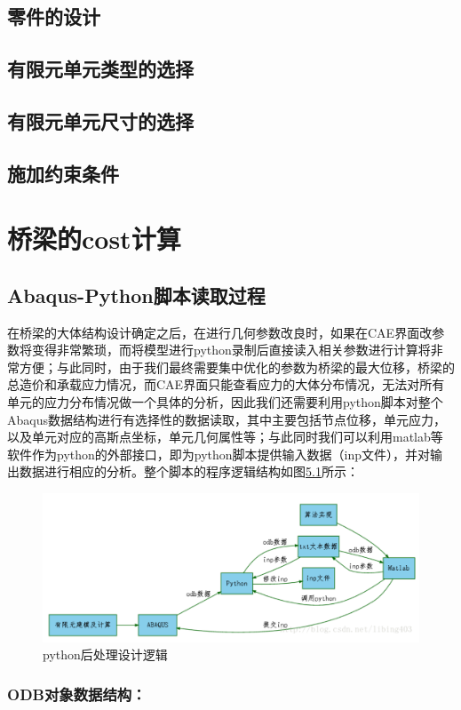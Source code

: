 \documentclass[forprint]{WHUBachelor}
\begin{document}
\section{零件的设计}
\section{有限元单元类型的选择}
\section{有限元单元尺寸的选择}
\section{施加约束条件}
\chapter{桥梁的cost计算}

\section{Abaqus-Python脚本读取过程}
在桥梁的大体结构设计确定之后，在进行几何参数改良时，如果在CAE界面改参数将变得非常繁琐，而将模型进行python录制后直接读入相关参数进行计算将非常方便；与此同时，由于我们最终需要集中优化的参数为桥梁的最大位移，桥梁的总造价和承载应力情况，而CAE界面只能查看应力的大体分布情况，无法对所有单元的应力分布情况做一个具体的分析，因此我们还需要利用python脚本对整个Abaqus数据结构进行有选择性的数据读取，其中主要包括节点位移，单元应力，以及单元对应的高斯点坐标，单元几何属性等；与此同时我们可以利用matlab等软件作为python的外部接口，即为python脚本提供输入数据（inp文件），并对输出数据进行相应的分析。整个脚本的程序逻辑结构如图\ref{4-1}所示：

\begin{figure}[H]
\centering  
\includegraphics[width = .8\textwidth]{1.png} 
\caption{python后处理设计逻辑} 
\label{4-1} 
\end{figure}

\subsection{ODB对象数据结构：}
\end{document}
